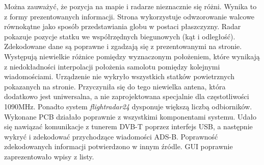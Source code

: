 \documentclass[eng,printmode]{mgr}
\begin{document}
Można zauważyć, że pozycja na mapie i radarze nieznacznie się różni. Wynika to z formy prezentowanych informacji. Strona wykorzystuje odwzorowanie walcowe równokątne jako sposób przedstawiania globu w postaci płaszczyzny. Radar pokazuje pozycje statku we współrzędnych biegunowych (kąt i odległość). Zdekodowane dane są poprawne i zgadzają się z prezentowanymi na stronie. Występują niewielkie różnice pomiędzy wyznaczonym położeniem, które wynikają z niedokładności interpolacji położenia samolotu pomiędzy kolejnymi wiadomościami. Urządzenie nie wykryło wszystkich statków powietrznych pokazanych na stronie. Przyczyniła się do tego niewielka antena, która dodatkowo jest uniwersalna, a nie zaprojektowana specjalnie dla częstotliwości 1090MHz. Ponadto system \textit{flightradar24} dysponuje większą liczbą odbiorników.
\\


Wykonane PCB działało poprawnie z wszystkimi komponentami systemu. Udało się nawiązać komunikacje z tunerem DVB-T poprzez interfejs USB, a następnie wykryć i zdekodować przychodzące wiadomości ADS-B. Poprawność zdekodowanych informacji potwierdzono w innym źródle. GUI poprawnie zaprezentowało wpisy z listy.

\end{document}
